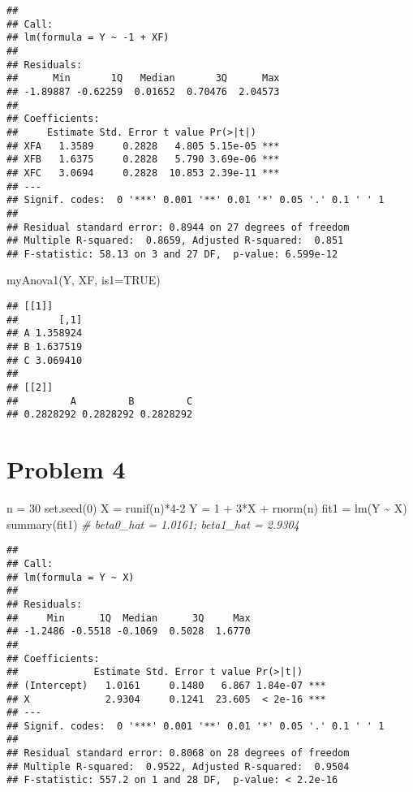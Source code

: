 \documentclass[
  11pt,
]{article}
\newenvironment{Shaded}{\begin{snugshade}}{\end{snugshade}}
\newcommand{\AttributeTok}[1]{\textcolor[rgb]{0.77,0.63,0.00}{#1}}
\newcommand{\CommentTok}[1]{\textcolor[rgb]{0.56,0.35,0.01}{\textit{#1}}}
\newcommand{\ConstantTok}[1]{\textcolor[rgb]{0.00,0.00,0.00}{#1}}
\newcommand{\DecValTok}[1]{\textcolor[rgb]{0.00,0.00,0.81}{#1}}
\newcommand{\FunctionTok}[1]{\textcolor[rgb]{0.00,0.00,0.00}{#1}}
\newcommand{\NormalTok}[1]{#1}
\newcommand{\OtherTok}[1]{\textcolor[rgb]{0.56,0.35,0.01}{#1}}
\newcommand{\SpecialCharTok}[1]{\textcolor[rgb]{0.00,0.00,0.00}{#1}}
\begin{document}
\begin{verbatim}
## 
## Call:
## lm(formula = Y ~ -1 + XF)
## 
## Residuals:
##      Min       1Q   Median       3Q      Max 
## -1.89887 -0.62259  0.01652  0.70476  2.04573 
## 
## Coefficients:
##     Estimate Std. Error t value Pr(>|t|)    
## XFA   1.3589     0.2828   4.805 5.15e-05 ***
## XFB   1.6375     0.2828   5.790 3.69e-06 ***
## XFC   3.0694     0.2828  10.853 2.39e-11 ***
## ---
## Signif. codes:  0 '***' 0.001 '**' 0.01 '*' 0.05 '.' 0.1 ' ' 1
## 
## Residual standard error: 0.8944 on 27 degrees of freedom
## Multiple R-squared:  0.8659, Adjusted R-squared:  0.851 
## F-statistic: 58.13 on 3 and 27 DF,  p-value: 6.599e-12
\end{verbatim}

\begin{Shaded}
\begin{Highlighting}[]
\FunctionTok{myAnova1}\NormalTok{(Y, XF, }\AttributeTok{is1=}\ConstantTok{TRUE}\NormalTok{)}
\end{Highlighting}
\end{Shaded}

\begin{verbatim}
## [[1]]
##       [,1]
## A 1.358924
## B 1.637519
## C 3.069410
## 
## [[2]]
##         A         B         C 
## 0.2828292 0.2828292 0.2828292
\end{verbatim}

\hypertarget{problem-4}{%
\section{Problem 4}\label{problem-4}}

\begin{Shaded}
\begin{Highlighting}[]
\NormalTok{n }\OtherTok{=} \DecValTok{30} 
\FunctionTok{set.seed}\NormalTok{(}\DecValTok{0}\NormalTok{)}
\NormalTok{X }\OtherTok{=} \FunctionTok{runif}\NormalTok{(n)}\SpecialCharTok{*}\DecValTok{4{-}2}
\NormalTok{Y }\OtherTok{=} \DecValTok{1} \SpecialCharTok{+} \DecValTok{3}\SpecialCharTok{*}\NormalTok{X }\SpecialCharTok{+} \FunctionTok{rnorm}\NormalTok{(n)}
\NormalTok{fit1 }\OtherTok{=} \FunctionTok{lm}\NormalTok{(Y }\SpecialCharTok{\textasciitilde{}}\NormalTok{ X) }
\FunctionTok{summary}\NormalTok{(fit1) }\CommentTok{\# beta0\_hat = 1.0161; beta1\_hat = 2.9304}
\end{Highlighting}
\end{Shaded}

\begin{verbatim}
## 
## Call:
## lm(formula = Y ~ X)
## 
## Residuals:
##     Min      1Q  Median      3Q     Max 
## -1.2486 -0.5518 -0.1069  0.5028  1.6770 
## 
## Coefficients:
##             Estimate Std. Error t value Pr(>|t|)    
## (Intercept)   1.0161     0.1480   6.867 1.84e-07 ***
## X             2.9304     0.1241  23.605  < 2e-16 ***
## ---
## Signif. codes:  0 '***' 0.001 '**' 0.01 '*' 0.05 '.' 0.1 ' ' 1
## 
## Residual standard error: 0.8068 on 28 degrees of freedom
## Multiple R-squared:  0.9522, Adjusted R-squared:  0.9504 
## F-statistic: 557.2 on 1 and 28 DF,  p-value: < 2.2e-16
\end{verbatim}
\end{document}
